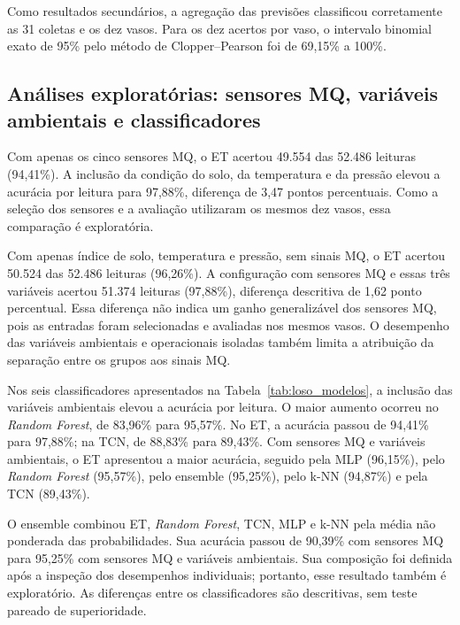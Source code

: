 Como resultados secundários, a agregação das previsões classificou corretamente as 31 coletas e os dez vasos. Para os dez acertos por vaso, o intervalo binomial exato de 95\% pelo método de Clopper--Pearson foi de 69,15\% a 100\%.

\subsection{Análises exploratórias: sensores MQ, variáveis ambientais e classificadores}
\label{subsec:res_mq}

Com apenas os cinco sensores MQ, o ET acertou 49.554 das 52.486 leituras (94,41\%). A inclusão da condição do solo, da temperatura e da pressão elevou a acurácia por leitura para 97,88\%, diferença de 3,47 pontos percentuais. Como a seleção dos sensores e a avaliação utilizaram os mesmos dez vasos, essa comparação é exploratória.

Com apenas índice de solo, temperatura e pressão, sem sinais MQ, o ET acertou 50.524 das 52.486 leituras (96,26\%). A configuração com sensores MQ e essas três variáveis acertou 51.374 leituras (97,88\%), diferença descritiva de 1,62 ponto percentual. Essa diferença não indica um ganho generalizável dos sensores MQ, pois as entradas foram selecionadas e avaliadas nos mesmos vasos. O desempenho das variáveis ambientais e operacionais isoladas também limita a atribuição da separação entre os grupos aos sinais MQ.

Nos seis classificadores apresentados na Tabela~\ref{tab:loso_modelos}, a inclusão das variáveis ambientais elevou a acurácia por leitura. O maior aumento ocorreu no \textit{Random Forest}, de 83,96\% para 95,57\%. No ET, a acurácia passou de 94,41\% para 97,88\%; na TCN, de 88,83\% para 89,43\%. Com sensores MQ e variáveis ambientais, o ET apresentou a maior acurácia, seguido pela MLP (96,15\%), pelo \textit{Random Forest} (95,57\%), pelo ensemble (95,25\%), pelo k-NN (94,87\%) e pela TCN (89,43\%).

O ensemble combinou ET, \textit{Random Forest}, TCN, MLP e k-NN pela média não ponderada das probabilidades. Sua acurácia passou de 90,39\% com sensores MQ para 95,25\% com sensores MQ e variáveis ambientais. Sua composição foi definida após a inspeção dos desempenhos individuais; portanto, esse resultado também é exploratório. As diferenças entre os classificadores são descritivas, sem teste pareado de superioridade.

